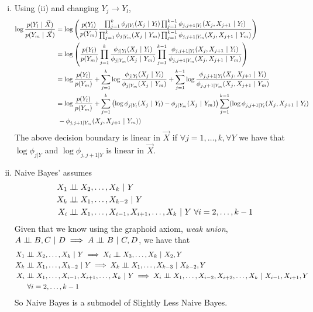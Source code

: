 \begin{enumerate}[(i)]
    \item Using (ii) and changing $Y_j \rightarrow Y_l$,
    \begin{align*}
        \log \frac{p(Y_l ~\vert~ \vec{X})}{p(Y_m ~\vert~ \vec{X})} &= \log\left( \frac{p(Y_l)}{p(Y_m)}\frac{\prod_{j=1}^k \phi_{j | Y_l}(X_j ~\vert~ Y_l)         \prod_{j=1}^{k-1} \phi_{j,j+1 | Y_l}(X_j, X_{j+1} ~\vert~ Y_l)}{\prod_{j=1}^k \phi_{j | Y_m}(X_j ~\vert~ Y_m)         \prod_{j=1}^{k-1} \phi_{j,j+1 | Y_m}(X_j, X_{j+1} ~\vert~ Y_m)} \right)\\
            &= \log\left(\frac{p(Y_l)}{p(Y_m)} \prod_{j=1}^k \frac{\phi_{j | Y_l}(X_j ~\vert~ Y_l)}{\phi_{j | Y_m}(X_j ~\vert~ Y_m)} \prod_{j=1}^{k-1} \frac{\phi_{j,j+1 | Y_l}(X_j, X_{j+1} ~\vert~ Y_l)}{\phi_{j,j+1 | Y_m}(X_j, X_{j+1} ~\vert~ Y_m)}\right)\\
            &= \log{\frac{p(Y_l)}{p(Y_m)}} + \sum_{j=1}^k \log{\frac{\phi_{j | Y_l}(X_j ~\vert~Y_l)}{\phi_{j | Y_m}(X_j ~\vert~Y_m)}} + \sum_{j=1}^{k-1}\log{\frac{\phi_{j,j+1 | Y_l}(X_j, X_{j+1} ~\vert~Y_l)}{\phi_{j,j+1 | Y_m}(X_j, X_{j+1} ~\vert~Y_m)}}\\
            &= \log{\frac{p(Y_l)}{p(Y_m)}} + \sum_{j=1}^k\left(\log\phi_{j | Y_l}(X_j ~\vert~ Y_l) - \phi_{j | Y_m}(X_j ~\vert~ Y_m)\right) \sum_{j=1}^{k-1}(\log\phi_{j,j+1 | Y_l}(X_j, X_{j+1} ~\vert~ Y_l) \\
            &~- \phi_{j,j+1 | Y_m}(X_j, X_{j+1} ~\vert~ Y_m))
    \end{align*}
    The above decision boundary is linear in $\vec{X}$ if $\forall j =1, \dots, k, \forall Y$ we have that $\log\phi_{j | Y}$ and $\log\phi_{j,j+1 | Y}$ is linear in $\vec{X}$.
    
    \item Naive Bayes' assumes
    \begin{align*}
    X_1 &\ci X_2, \dots, X_k \given Y \\
    X_k &\ci X_1, \dots, X_{k-2} \given Y\\
    X_i &\ci X_1, \dots, X_{i-1}, X_{i+1}, \dots, X_k \given Y ~\forall i = 2, \dots, k-1
    \end{align*}
    Given that we know using the graphoid axiom, \emph{weak union}, $A \perp\!\!\!\perp B, C ~\vert~ D \implies A \perp\!\!\!\perp B ~\vert~ C, D$, we have that
    \begin{align*}
    X_1 &\ci X_2, \dots, X_k \given Y \implies X_i \ci X_3, \dots, X_k \given X_2, Y\\  
    X_k &\ci X_1, \dots, X_{k-2} \given Y \implies X_k \ci X_1, \dots, X_{k-3} \given X_{k-2}, Y\\
    X_i &\ci X_1, \dots, X_{i-1}, X_{i+1}, \dots, X_k \given Y  \implies X_i \ci X_1, \dots, X_{i-2}, X_{i+2}, \dots, X_k \given X_{i-1}, X_{i+1}, Y\\ &~\forall i = 2, \dots, k-1
    \end{align*}
    So Naive Bayes is a submodel of Slightly Less Naive Bayes. 
    
\end{enumerate}